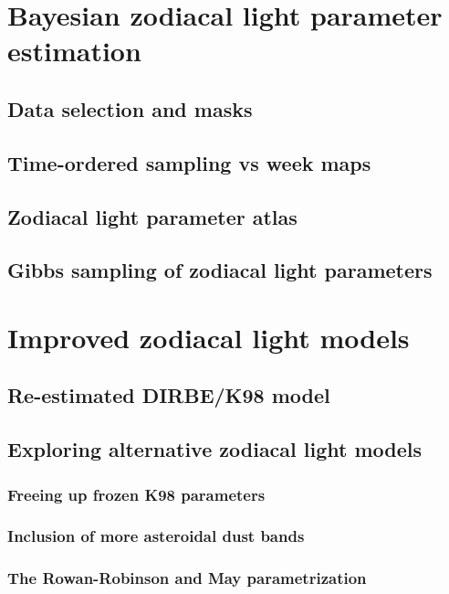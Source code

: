 \documentclass{aa}
\begin{document}
\section{Bayesian zodiacal light parameter estimation}
\subsection{Data selection and masks}
\subsection{Time-ordered sampling vs week maps}
\subsection{Zodiacal light parameter atlas}
\subsection{Gibbs sampling of zodiacal light parameters}

\section{Improved zodiacal light models}
\subsection{Re-estimated DIRBE/K98 model}
\subsection{Exploring alternative zodiacal light models}
\subsubsection{Freeing up frozen K98 parameters}
\subsubsection{Inclusion of more asteroidal dust bands}
\subsubsection{The Rowan-Robinson and May parametrization}


\end{document}
